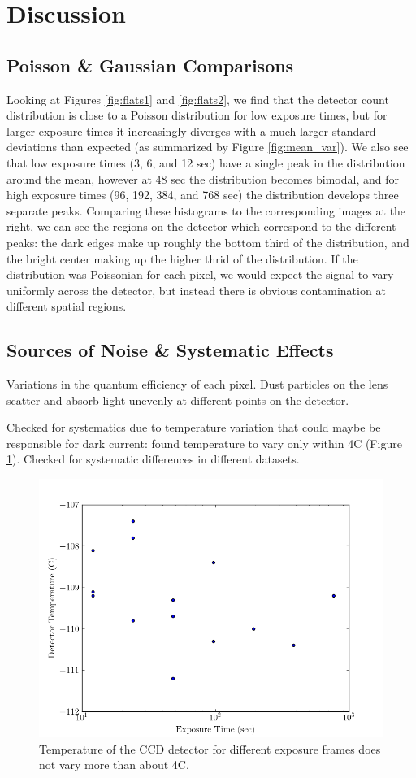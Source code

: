 \documentclass[preprint]{aastex62}
\begin{document}
\section{Discussion}
\subsection{Poisson \& Gaussian Comparisons} \label{subsec:dist_comparisons}
Looking at Figures \ref{fig:flats1} and \ref{fig:flats2}, we find that the detector count distribution is close to a Poisson distribution for low exposure times, but for larger exposure times it increasingly diverges with a much larger standard deviations than expected (as summarized by Figure \ref{fig:mean_var}). We also see that low exposure times (3, 6, and 12 sec) have a single peak in the distribution around the mean, however at 48 sec the distribution becomes bimodal, and for high exposure times (96, 192, 384, and 768 sec) the distribution develops three separate peaks. Comparing these histograms to the corresponding images at the right, we can see the regions on the detector which correspond to the different peaks: the dark edges make up roughly the bottom third of the distribution, and the bright center making up the higher thrid of the distribution. If the distribution was Poissonian for each pixel, we would expect the signal to vary uniformly across the detector, but instead there is obvious contamination at different spatial regions.

\subsection{Sources of Noise \& Systematic Effects}
Variations in the quantum efficiency of each pixel.
Dust particles on the lens scatter and absorb light unevenly at different points on the detector.

Checked for systematics due to temperature variation that could maybe be responsible for dark current: found temperature to vary only within 4C (Figure \ref{fig:temp}). Checked for systematic differences in different datasets. 

\begin{figure}[ht]
\begin{center}
\includegraphics[width=.48\linewidth]{plots/exposure_temp.png}
\caption{Temperature of the CCD detector for different exposure frames does not vary more than about 4C.} \label{fig:temp}
\end{center}
\end{figure}
\end{document}
